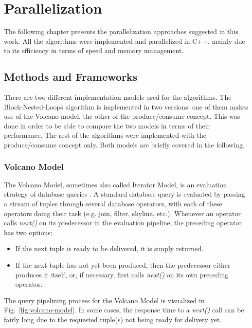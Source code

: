 \chapter{Parallelization} \label{chapter:Parallelization}
The following chapter presents the parallelization approaches suggested in this work. %
All the algorithms were implemented and parallelized in C++, mainly due to its efficiency in terms of speed and memory management. 

\section{Methods and Frameworks} \label{section:methods-frameworks}
There are two different implementation models used for the algorithms. The Block-Nested-Loops algorithm is implemented in two versions: one of them makes use of the Volcano model, the other of the produce/consume concept. This was done in order to be able to compare the two models in terms of their performance. The rest of the algorithms were implemented with the produce/consume concept only. Both models are briefly covered in the following. 

\subsection{Volcano Model}
The Volcano Model, sometimes also called Iterator Model, is an evaluation strategy of database queries \cite{volcano-wiki}. A standard database query is evaluated by passing a stream of tuples through several database operators, with each of these operators doing their task (e.g. join, filter, skyline, etc.). Whenever an operator calls \textit{next()} on its predecessor in the evaluation pipeline, the preceding operator has two options: 
\begin{itemize}
	\item If the next tuple is ready to be delivered, it is simply returned. 
	\item If the next tuple has not yet been produced, then the predecessor either produces it itself, or, if necessary, first calls \textit{next()} on its own preceding operator. 
\end{itemize}
The query pipelining process for the Volcano Model is visualized in Fig.~\ref{fig:volcano-model}. In some cases, the response time to a \textit{next()} call can be fairly long due to the requested tuple(s) not being ready for delivery yet. %

